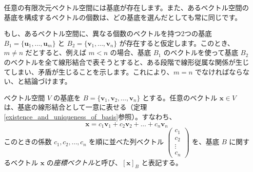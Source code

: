 \begin{thm}[基底の存在と一意性] \label{existence_and_uniqueness_of_basis}
任意の有限次元ベクトル空間には基底が存在します。また、あるベクトル空間の基底を構成するベクトルの個数は、どの基底を選んだとしても常に同じです。
\begin{proof*}
もし、あるベクトル空間に、異なる個数のベクトルを持つ2つの基底 $B_1 = \{\bm{u}_1, \ldots, \bm{u}_m\}$ と $B_2 = \{\bm{v}_1, \ldots, \bm{v}_n\}$ が存在すると仮定します。このとき、$m \neq n$ だとすると、例えば $m < n$ の場合、基底 $B_1$ のベクトルを使って基底 $B_2$ のベクトルを全て線形結合で表そうとすると、ある段階で線形従属な関係が生じてしまい、矛盾が生じることを示します。これにより、$m=n$ でなければならない、と結論づけます。
\end{proof*}
\end{thm}

\begin{dfn}[座標ベクトル]
ベクトル空間 $V$ の基底を $B = \{\bm{v}_1, \bm{v}_2, \ldots, \bm{v}_n\}$ とする。任意のベクトル $\bm{x} \in V$ は、基底の線形結合として一意に表せる（定理\ref{existence_and_uniqueness_of_basis}参照）。すなわち、
\[ \bm{x} = c_1 \bm{v}_1 + c_2 \bm{v}_2 + \dots + c_n \bm{v}_n \]
このときの係数 $c_1, c_2, \ldots, c_n$ を順に並べた列ベクトル $\begin{pmatrix} c_1 \\ c_2 \\ \vdots \\ c_n \end{pmatrix}$ を、基底 $B$ に関するベクトル $\bm{x}$ の\emph{座標ベクトル}と呼び、$[\bm{x}]_B$ と表記する。
\end{dfn}


